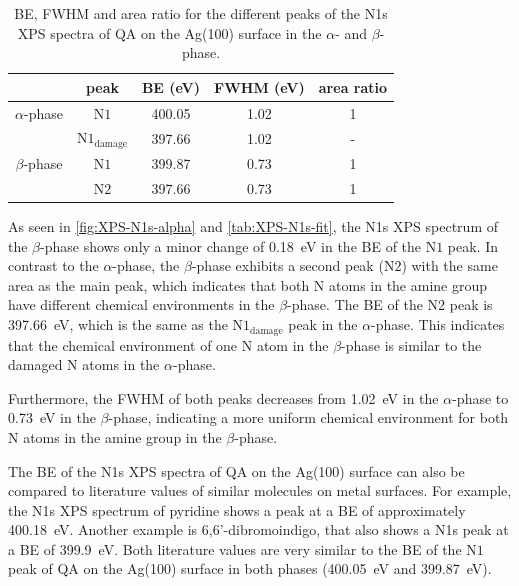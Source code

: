 \begin{table}[H]
	\centering
	\caption{\Ac{BE}, \ac{FWHM} and area ratio for the different peaks of the N1s \ac{XPS} spectra of \ac{QA} on the Ag(100) surface in the $\alpha$- and $\beta$-phase.}
	\begin{tabular}{@{}ccccc@{}} \toprule
		 & peak & \ac{BE} (eV) & \ac{FWHM} (eV) & area ratio \\
		\midrule
		$\alpha$-phase & $\mathrm{N1}$ & 400.05 & 1.02 & 1 \\
		& $\mathrm{N1_{damage}}$ & 397.66 & 1.02 & - \\
        \midrule
		$\beta$-phase & $\mathrm{N1}$ & 399.87 & 0.73 & 1 \\
		& $\mathrm{N2}$ & 397.66 & 0.73 & 1 \\
		\bottomrule
	\end{tabular}
	\label{tab:XPS-N1s-fit}
\end{table}

As seen in \autoref{fig:XPS-N1s-alpha} and \autoref{tab:XPS-N1s-fit}, the N1s \ac{XPS} spectrum of the $\beta$-phase shows only a minor change of 0.18~\si{eV} in the \ac{BE} of the $\mathrm{N1}$ peak. In contrast to the $\alpha$-phase, the $\beta$-phase exhibits a second peak ($\mathrm{N2}$) with the same area as the main peak, which indicates that both N atoms in the amine group have different chemical environments in the $\beta$-phase. The \ac{BE} of the $\mathrm{N2}$ peak is 397.66~\si{eV}, which is the same as the $\mathrm{N1_{damage}}$ peak in the $\alpha$-phase. This indicates that the chemical environment of one N atom in the $\beta$-phase is similar to the damaged N atoms in the $\alpha$-phase.

Furthermore, the \ac{FWHM} of both peaks decreases from 1.02~\si{eV} in the $\alpha$-phase to 0.73~\si{eV} in the $\beta$-phase, indicating a more uniform chemical environment for both N atoms in the amine group in the $\beta$-phase. 

The \ac{BE} of the N1s \ac{XPS} spectra of \ac{QA} on the Ag(100) surface can also be compared to literature values of similar molecules on metal surfaces. For example, the N1s \ac{XPS} spectrum of pyridine shows a peak at a \ac{BE} of approximately 400.18~\si{eV}.\autocite{Bagus2025}  Another example is 6,6'-dibromoindigo, that also shows a N1s peak at a \ac{BE} of 399.9~\si{eV}.\autocite{Xu2024} Both literature values are very similar to the \ac{BE} of the $\mathrm{N1}$ peak of \ac{QA} on the Ag(100) surface in both phases (400.05~\si{eV} and 399.87~\si{eV}).

